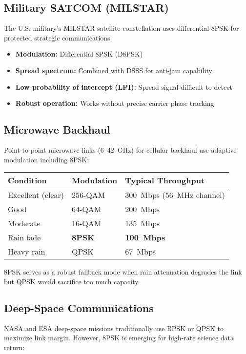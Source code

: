 \subsection{Military SATCOM (MILSTAR)}

The U.S. military's MILSTAR satellite constellation uses differential 8PSK for protected strategic communications:
\begin{itemize}
\item \textbf{Modulation:} Differential 8PSK (D8PSK)
\item \textbf{Spread spectrum:} Combined with DSSS for anti-jam capability
\item \textbf{Low probability of intercept (LPI):} Spread signal difficult to detect
\item \textbf{Robust operation:} Works without precise carrier phase tracking
\end{itemize}

\subsection{Microwave Backhaul}

Point-to-point microwave links (6--42~GHz) for cellular backhaul use adaptive modulation including 8PSK:

\begin{center}
\begin{tabular}{@{}lll@{}}
\toprule
Condition & Modulation & Typical Throughput \\
\midrule
Excellent (clear) & 256-QAM & 300~Mbps (56~MHz channel) \\
Good & 64-QAM & 200~Mbps \\
Moderate & 16-QAM & 135~Mbps \\
Rain fade & \textbf{8PSK} & \textbf{100~Mbps} \\
Heavy rain & QPSK & 67~Mbps \\
\bottomrule
\end{tabular}
\end{center}

8PSK serves as a robust fallback mode when rain attenuation degrades the link but QPSK would sacrifice too much capacity.

\subsection{Deep-Space Communications}

NASA and ESA deep-space missions traditionally use BPSK or QPSK to maximize link margin. However, 8PSK is emerging for high-rate science data return:

